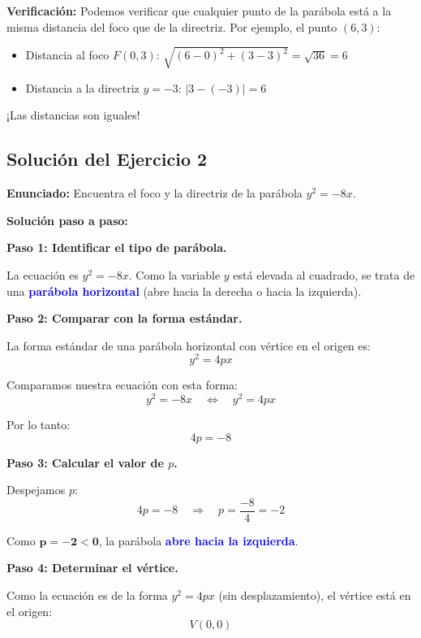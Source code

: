 \documentclass[12pt,a4paper]{article}
\begin{document}
	\bigskip

	\textbf{Verificación:} Podemos verificar que cualquier punto de la parábola está a la misma distancia del foco que de la directriz. Por ejemplo, el punto \((6,3)\):
	\begin{itemize}
		\item Distancia al foco \(F(0,3)\): \(\sqrt{(6-0)^2+(3-3)^2}=\sqrt{36}=6\)
		\item Distancia a la directriz \(y=-3\): \(|3-(-3)|=6\)
	\end{itemize}
	¡Las distancias son iguales!

	\newpage

	\subsection*{Solución del Ejercicio 2}

	\textbf{Enunciado:} Encuentra el foco y la directriz de la parábola \(y^2=-8x\).

	\bigskip

	\textbf{Solución paso a paso:}

	\bigskip

	\textbf{Paso 1: Identificar el tipo de parábola.}

	La ecuación es \(y^2=-8x\). Como la variable \(y\) está elevada al cuadrado, se trata de una \textcolor{blue}{\textbf{parábola horizontal}} (abre hacia la derecha o hacia la izquierda).

	\bigskip

	\textbf{Paso 2: Comparar con la forma estándar.}

	La forma estándar de una parábola horizontal con vértice en el origen es:
	\[
	y^2=4px
	\]

	Comparamos nuestra ecuación con esta forma:
	\[
	y^2=-8x \quad\Leftrightarrow\quad y^2=4px
	\]

	Por lo tanto:
	\[
	4p=-8
	\]

	\textbf{Paso 3: Calcular el valor de \(p\).}

	Despejamos \(p\):
	\[
	4p=-8 \quad\Rightarrow\quad p=\frac{-8}{4}=-2
	\]

	Como \(\mathbf{p=-2<0}\), la parábola \textcolor{blue}{\textbf{abre hacia la izquierda}}.

	\bigskip

	\textbf{Paso 4: Determinar el vértice.}

	Como la ecuación es de la forma \(y^2=4px\) (sin desplazamiento), el vértice está en el origen:
	\[
	\boxed{V(0,0)}
	\]
\end{document}
